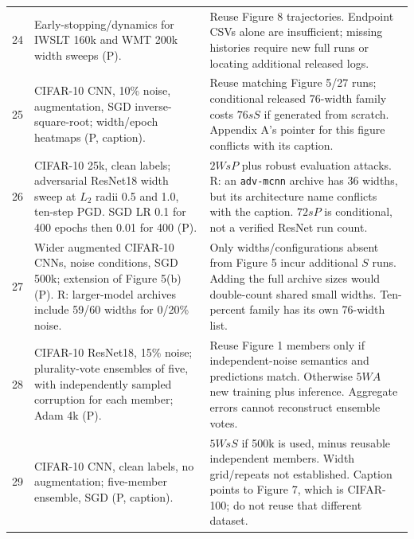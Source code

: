\documentclass{article}
\begin{document}
\begin{longtable}{@{}P{0.32in}P{3.47in}P{2.9in}@{}}
24 & Early-stopping/dynamics for IWSLT 160k and WMT 200k width sweeps (P). & Reuse Figure 8 trajectories. Endpoint CSVs alone are insufficient; missing histories require new full runs or locating additional released logs.\\
25 & CIFAR-10 CNN, 10\% noise, augmentation, SGD inverse-square-root; width/epoch heatmaps (P, caption). & Reuse matching Figure 5/27 runs; conditional released 76-width family costs $76sS$ if generated from scratch. Appendix A's pointer for this figure conflicts with its caption.\\
26 & CIFAR-10 25k, clean labels; adversarial ResNet18 width sweep at $L_2$ radii 0.5 and 1.0, ten-step PGD. SGD LR 0.1 for 400 epochs then 0.01 for 400 (P). & $2WsP$ plus robust evaluation attacks. R: an \texttt{adv-mcnn} archive has 36 widths, but its architecture name conflicts with the caption. $72sP$ is conditional, not a verified ResNet run count.\\
27 & Wider augmented CIFAR-10 CNNs, noise conditions, SGD 500k; extension of Figure 5(b) (P). R: larger-model archives include 59/60 widths for 0/20\% noise. & Only widths/configurations absent from Figure 5 incur additional $S$ runs. Adding the full archive sizes would double-count shared small widths. Ten-percent family has its own 76-width list.\\
28 & CIFAR-10 ResNet18, 15\% noise; plurality-vote ensembles of five, with independently sampled corruption for each member; Adam 4k (P). & Reuse Figure 1 members only if independent-noise semantics and predictions match. Otherwise $5WA$ new training plus inference. Aggregate errors cannot reconstruct ensemble votes.\\
29 & CIFAR-10 CNN, clean labels, no augmentation; five-member ensemble, SGD (P, caption). & $5WsS$ if 500k is used, minus reusable independent members. Width grid/repeats not established. Caption points to Figure 7, which is CIFAR-100; do not reuse that different dataset.\\
\bottomrule
\end{longtable}
\endgroup
\end{document}
